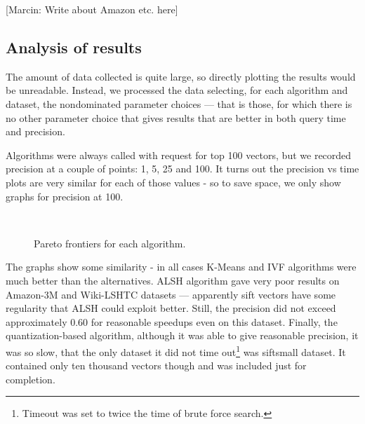 [Marcin: Write about Amazon etc. here]



\subsection{Analysis of results}

The amount of data collected is quite large, so directly plotting the results would be
unreadable. Instead, we processed the data selecting, for each algorithm and dataset,
the nondominated parameter choices --- that is those, for which there is no other
parameter choice that gives results that are better in both query time and precision.

Algorithms were always called with request for top 100 vectors, but we recorded
precision at a couple of points: 1, 5, 25 and 100. It turns out the precision vs time
plots are very similar for each of those values - so to save space, we only show
graphs for precision at 100.

\begin{figure}[H]
	\centering
	\\
\caption{Pareto frontiers for each algorithm.}
\end{figure}

The graphs show some similarity - in all cases K-Means and IVF algorithms were much better
than the alternatives. ALSH algorithm gave very poor results on Amazon-3M and Wiki-LSHTC
datasets --- apparently sift vectors have some regularity that ALSH could exploit better.
Still, the precision did not exceed approximately $0.60$ for reasonable speedups even on
this dataset. Finally, the quantization-based algorithm, although it was able to give
reasonable precision, it was so slow, that the only dataset it did not time 
out\footnote{Timeout was set to twice the time of brute force search.}
was siftsmall dataset. It contained only ten thousand vectors though and was included
just for completion.

